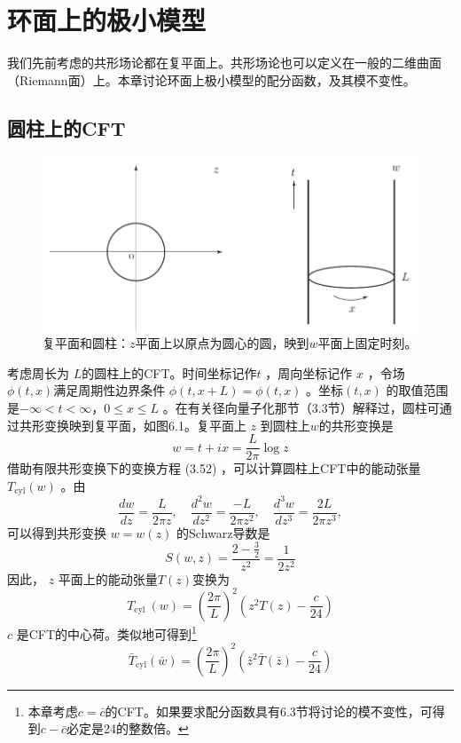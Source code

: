 \chapter{环面上的极小模型}
我们先前考虑的共形场论都在复平面上。共形场论也可以定义在一般的二维曲面（Riemann面）上。本章讨论环面上极小模型的配分函数，及其模不变性。

\section{圆柱上的CFT}
\begin{figure}[h]
	\centering
	\includegraphics[width=0.6\linewidth]{fig/6.1.png}
	\caption{复平面和圆柱：$z$平面上以原点为圆心的圆，映到$w$平面上固定时刻。}
\end{figure}

考虑周长为 $L $的圆柱上的CFT。时间坐标记作$ t$ ，周向坐标记作 $x$ ，令场 $\phi(t, x) $满足周期性边界条件 $\phi(t, x+L)=\phi(t, x)$ 。坐标$ (t,x)$ 的取值范围是$ -\infty<t<\infty $，$ 0 \leq x \leq L$ 。在有关径向量子化那节（3.3节）解释过，圆柱可通过共形变换映到复平面，如图6.1。复平面上 $z$ 到圆柱上$ w $的共形变换是
\begin{equation}
	w=t+i x=\frac{L}{2 \pi} \log z
\end{equation} 
借助有限共形变换下的变换方程 (3.52) ，可以计算圆柱上CFT中的能动张量 $T_{\mathrm{cyl}}(w)$ 。由
$$
\frac{d w}{d z}=\frac{L}{2 \pi z}, \quad \frac{d^{2} w}{d z^{2}}=\frac{-L}{2 \pi z^{2}}, \quad \frac{d^{3} w}{d z^{3}}=\frac{2 L}{2 \pi z^{3}},
$$
可以得到共形变换 $w=w(z)$ 的Schwarz导数是
$$
S(w, z)=\frac{2-\frac{3}{2}}{z^{2}}=\frac{1}{2 z^{2}}
$$
因此， $z$ 平面上的能动张量$ T(z) $变换为
\begin{equation}
	T_{\text {cyl }}(w)=\left(\frac{2 \pi}{L}\right)^{2}\left(z^{2} T(z)-\frac{c}{24}\right)
\end{equation} 
$c$ 是CFT的中心荷。类似地可得到\footnote{本章考虑$c=\bar{c}$的CFT。如果要求配分函数具有6.3节将讨论的模不变性，可得到$c-\bar{c}$必定是24的整数倍。}
\begin{equation}
	\bar{T}_{\mathrm{cyl}}(\bar{w})=\left(\frac{2 \pi}{L}\right)^{2}\left(\bar{z}^{2} \bar{T}(\bar{z})-\frac{c}{24}\right) 
\end{equation}

